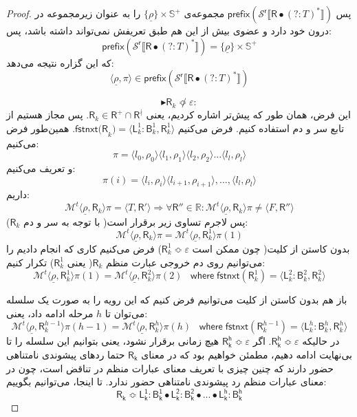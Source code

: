 \begin{proof}
پس 
$\mathsf{prefix(\mathcal{S}^r \llbracket \mathsf{R} \bullet (?:\mathit{T})^* \rrbracket)}$
مجموعه‌ی 
$\{\underline{\rho}\} \times \mathbb{S}^+$
را به عنوان زیرمجموعه در درون خود دارد و عضوی بیش از این هم طبق تعریفش نمی‌تواند داشته باشد، پس:
$$\mathsf{prefix(\mathcal{S}^r \llbracket \mathsf{R} \bullet (?:\mathit{T})^* \rrbracket)}=
\{\underline{\rho}\} \times \mathbb{S}^+$$
که این گزاره نتیجه می‌دهد:
$$\langle \underline{\rho}, \pi \rangle \in \mathsf{prefix(\mathcal{S}^r \llbracket \mathsf{R} \bullet (?:\mathit{T})^* \rrbracket)}$$

$$\blacktriangleright \mathsf{R}_k \not\Bumpeq \varepsilon:$$
این فرض، همان طور که پیش‌تر اشاره کردیم، یعنی
$\mathsf{R}_k \in \mathsf{R}^+ \cap \mathsf{R}^\nmid$.
پس مجاز هستیم از تابع سر و دم استفاده کنیم. فرض می‌کنیم 
$\mathsf{fstnxt(R}_k) = \langle \mathsf{L}_k^1 : \mathsf{B}_k^1 , \mathsf{R}_k^1 \rangle$.
همین‌طور فرض می‌کنیم:
$$\pi = \langle l_0,\rho_0 \rangle \langle l_1 , \rho_1 \rangle \langle l_2 , \rho_2 \rangle ... \langle l_l , \rho_l \rangle$$
و تعریف می‌کنیم:
$$\pi(i)=\langle l_i , \rho_i\rangle \langle l_{i+1},\rho_{i+1}\rangle,...,\langle l_l,\rho_l \rangle$$
داریم:
$$\mathcal{M}^t \langle \underline{\rho},\mathsf{R}_k \rangle \pi = \langle \mathit{T} , \mathsf{R'} \rangle \Rightarrow \forall \mathsf{R''} \in \mathbb{R}: \mathcal{M}^t \langle \underline{\rho},\mathsf{R}_k \rangle \pi \neq \langle \mathit{F},\mathsf{R}'' \rangle$$
پس لاجرم تساوی زیر برقرار است( با توجه به سر و دم $\mathsf{R}_k$):
$$\mathcal{M}^t \langle \underline{\rho}, \mathsf{R}_k \rangle \pi= \mathcal{M}^t \langle \underline{\rho}, \mathsf{R}_k^1 \rangle \pi(1)$$
بدون کاستن از کلیت( چون ممکن است $\mathsf{R}_k^1 \Bumpeq \varepsilon$) فرض می‌کنیم کاری که انجام دادیم را می‌توانیم روی دم خروجی عبارت منظم $\mathsf{R}_k$( یعنی $\mathsf{R}_k^1$) تکرار کنیم:
$$\mathcal{M}^t \langle \underline{\rho}, \mathsf{R}_k^1 \rangle \pi(1)= \mathcal{M}^t \langle \underline{\rho}, \mathsf{R}_k^2 \rangle \pi(2)\;\;\; \mathsf{where\;fstnxt}(\mathsf{R}_k^1)=\langle \mathsf{L}_k^2 : \mathsf{B}_k^2 , \mathsf{R}_k^2 \rangle$$

باز هم بدون کاستن از کلیت می‌توانیم فرض کنیم که این رویه را به صورت یک سلسله می‌توان تا $h$ مرحله ادامه داد، یعنی:
$$\mathcal{M}^t \langle \underline{\rho},\mathsf{R}_k^{h-1} \rangle \pi(h-1)=\mathcal{M}^t\langle \underline{\rho},\mathsf{R}_k^{h} \rangle \pi(h) \;\;\;
\mathsf{where\;fstnxt}(\mathsf{R}_k^{h-1})=\langle \mathsf{L}_k^{h} : \mathsf{B}_k^{h} , \mathsf{R}_k^{h} \rangle$$
در حالیکه 
$\mathsf{R_k^h} \Bumpeq \varepsilon$. 
اگر $\mathsf{R_k^h} \Bumpeq \varepsilon$ هیچ زمانی برقرار نشود، یعنی بتوانیم این سلسله را تا بی‌نهایت ادامه دهیم، مطمئن خواهیم بود که در معنای $\mathsf{R_k}$ حتما ردهای پیشوندی نامتناهی حضور دارند که چنین چیزی با تعریف معنای عبارات منظم در تناقض است، چون در معنای عبارات منظم رد پیشوندی نامتناهی حضور ندارد.
تا اینجا، می‌توانیم بگوییم:
$$\mathsf{R_k} \Bumpeq \mathsf{L_k^1 : B_k^1 \bullet L_k^2:B_k^2 \bullet ... \bullet L_k^h:B_k^h}$$


\end{proof}
